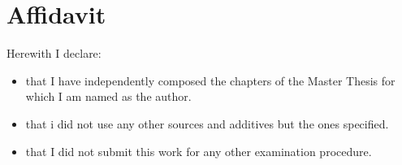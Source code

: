 \thispagestyle{empty}
\section*{Affidavit}
Herewith I declare:
\begin{itemize}
\item that I have independently composed the chapters of the Master Thesis for which I am named as the author.
\item that i did not use any other sources and additives but the ones specified.
\item that I did not submit this work for any other examination procedure.
\end{itemize}
\begin{verbatim}





\end{verbatim}
